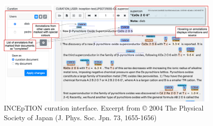 \begin{figure}[htb]
    \centering
    \includegraphics[width=\linewidth]{figures/supermat/Fig7.png}
    \caption{INCEpTION curation interface. Excerpt from © 2004 The Physical Society of Japan (J. Phys. Soc. Jpn. 73, 1655-1656)}
    \label{fig:inception-curation-interface}
\end{figure}













